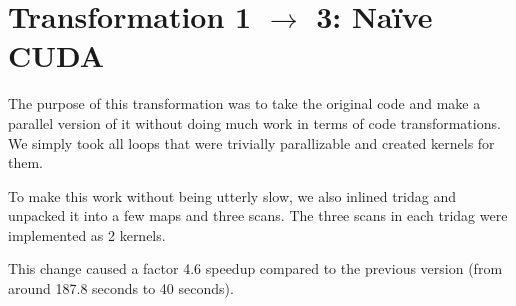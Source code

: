\section{Transformation 1 $\rightarrow$ 3: Naïve CUDA}

The purpose of this transformation was to take the original code and
make a parallel version of it without doing much work in terms of code
transformations. We simply took all loops that were trivially
parallizable and created kernels for them.

To make this work without being utterly slow, we also inlined tridag
and unpacked it into a few maps and three scans. The three scans in
each tridag were implemented as 2 kernels.

This change caused a factor 4.6 speedup compared to the previous version
(from around 187.8 seconds to 40 seconds).
